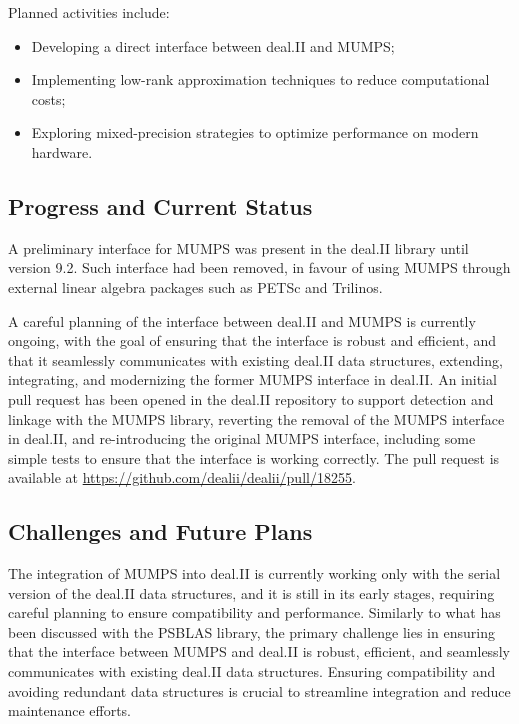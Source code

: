 \documentclass[a4paper,12pt]{article}
\begin{document}
    Planned activities include:
    \begin{itemize}
        \item Developing a direct interface between deal.II and MUMPS;
        \item Implementing low-rank approximation techniques to reduce computational costs;
        \item Exploring mixed-precision strategies to optimize performance on modern hardware.
    \end{itemize}

    \subsection{Progress and Current Status}
    A preliminary interface for MUMPS was present in the deal.II library until
    version 9.2. Such interface had been removed, in favour of using MUMPS
    through external linear algebra packages such as PETSc and Trilinos.
    
    A careful planning of the interface between deal.II and MUMPS is currently
    ongoing, with the goal of ensuring that the interface is robust and efficient,
    and that it seamlessly communicates with existing deal.II data structures, extending, integrating, and modernizing the former MUMPS interface in deal.II. An initial pull request
    has been opened in the deal.II repository to support detection and linkage
    with the MUMPS library, reverting the removal of the MUMPS interface in deal.II, and re-introducing the original MUMPS interface, including some simple tests to ensure that the interface is working correctly. The pull request is available at
    \url{https://github.com/dealii/dealii/pull/18255}.
    
    \subsection{Challenges and Future Plans}

    The integration of MUMPS into deal.II is currently working only with the
    serial version of the deal.II data structures, and it is still in its early
    stages, requiring careful planning to ensure compatibility and performance.
    Similarly to what has been discussed with the PSBLAS library, the primary
    challenge lies in ensuring that the interface between MUMPS and deal.II is
    robust, efficient, and seamlessly communicates with existing deal.II data
    structures. Ensuring compatibility and avoiding redundant data structures is
    crucial to streamline integration and reduce maintenance efforts.



    
\label{MyLastPage}
\end{document}

